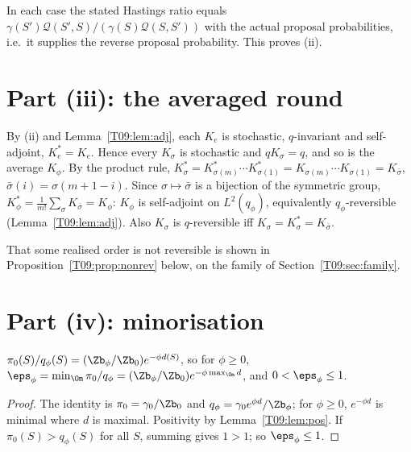 \documentclass[11pt]{report}
\begin{document}
In each case the stated Hastings ratio equals $\gamma(S')\mathcal Q(S',S)/(\gamma(S)\mathcal Q(S,S'))$ with the actual proposal probabilities, i.e.\ it supplies the reverse proposal probability. This proves (ii).

\section{Part (iii): the averaged round}

By (ii) and Lemma~\ref{T09:lem:adj}, each $K_e$ is stochastic, $q$-invariant and self-adjoint, $K_e^*=K_e$. Hence every $K_\sigma$ is stochastic and $qK_\sigma=q$, and so is the average $K_\phi$. By the product rule, $K_\sigma^*=K_{\sigma(m)}^*\cdots K_{\sigma(1)}^*=K_{\sigma(m)}\cdots K_{\sigma(1)}=K_{\bar\sigma}$, $\bar\sigma(i)=\sigma(m+1-i)$. Since $\sigma\mapsto\bar\sigma$ is a bijection of the symmetric group,
$K_\phi^*=\frac1{m!}\sum_\sigma K_{\bar\sigma}=K_\phi$: $K_\phi$ is self-adjoint on $L^2(q_\phi)$, equivalently $q_\phi$-reversible (Lemma~\ref{T09:lem:adj}). Also $K_\sigma$ is $q$-reversible iff $K_\sigma=K_\sigma^*=K_{\bar\sigma}$.

That some realised order is not reversible is shown in Proposition~\ref{T09:prop:nonrev} below, on the family of Section~\ref{T09:sec:family}.

\section{Part (iv): minorisation}

\begin{T09lemma}\label{T09:lem:eps}
$\pi_0(S)/q_\phi(S)=(\Zb_\phi/\Zb_0)e^{-\phi d(S)}$, so for $\phi\ge0$, $\eps_\phi=\min_\Om\pi_0/q_\phi=(\Zb_\phi/\Zb_0)e^{-\phi\max_\Om d}$, and $0<\eps_\phi\le1$.
\end{T09lemma}
\begin{proof}
The identity is $\pi_0=\gamma_0/\Zb_0$ and $q_\phi=\gamma_0e^{\phi d}/\Zb_\phi$; for $\phi\ge0$, $e^{-\phi d}$ is minimal where $d$ is maximal. Positivity by Lemma~\ref{T09:lem:pos}. If $\pi_0(S)>q_\phi(S)$ for all $S$, summing gives $1>1$; so $\eps_\phi\le1$.
\end{proof}
\end{document}
